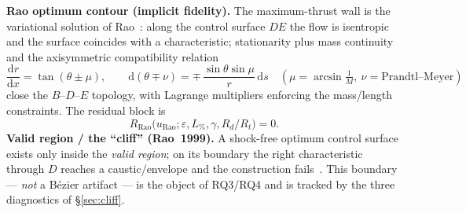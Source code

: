 \documentclass[11pt]{article}
\newcommand{\dd}[2]{\frac{\mathrm{d}#1}{\mathrm{d}#2}}
\newcommand{\Rt}{R_t}
\begin{document}
\smallskip
\textbf{Rao optimum contour (implicit fidelity).} The maximum-thrust wall is the
variational solution of Rao~\cite{rao1958}: along the control surface $DE$ the
flow is isentropic and the surface coincides with a characteristic; stationarity
plus mass continuity and the axisymmetric compatibility relation
\begin{equation}
\dd{r}{x}=\tan(\theta\pm\mu),\qquad
\mathrm{d}(\theta\mp\nu)=\mp\,\frac{\sin\theta\sin\mu}{r}\,\mathrm{d}s
\quad(\mu=\arcsin\tfrac1M,\ \nu=\text{Prandtl--Meyer})
\end{equation}
close the $B$--$D$--$E$ topology, with Lagrange multipliers enforcing the
mass/length constraints. The residual block is
\begin{equation}
R_\mathrm{Rao}\big(u_\mathrm{Rao};\varepsilon,L_\%,\gamma,R_d/\Rt\big)=0 .
\end{equation}
\textbf{Valid region / the ``cliff'' (Rao~1999).} A shock-free optimum control
surface exists only inside the \emph{valid region}; on its boundary the right
characteristic through $D$ reaches a caustic/envelope and the construction
fails~\cite{rao1999}. This boundary --- \emph{not} a B\'ezier artifact --- is the
object of RQ3/RQ4 and is tracked by the three diagnostics of \S\ref{sec:cliff}.
\end{document}

